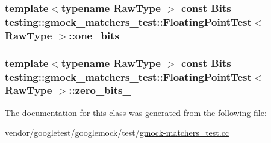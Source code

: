 \subsubsection[{\texorpdfstring{one\+\_\+bits\+\_\+}{one_bits_}}]{\setlength{\rightskip}{0pt plus 5cm}template$<$typename Raw\+Type $>$ const {\bf Bits} {\bf testing\+::gmock\+\_\+matchers\+\_\+test\+::\+Floating\+Point\+Test}$<$ Raw\+Type $>$\+::one\+\_\+bits\+\_\+\hspace{0.3cm}{\ttfamily [protected]}}\hypertarget{classtesting_1_1gmock__matchers__test_1_1FloatingPointTest_ae26de8492d307d2b4c30f6b952d9a412}{}\label{classtesting_1_1gmock__matchers__test_1_1FloatingPointTest_ae26de8492d307d2b4c30f6b952d9a412}
\subsubsection[{\texorpdfstring{zero\+\_\+bits\+\_\+}{zero_bits_}}]{\setlength{\rightskip}{0pt plus 5cm}template$<$typename Raw\+Type $>$ const {\bf Bits} {\bf testing\+::gmock\+\_\+matchers\+\_\+test\+::\+Floating\+Point\+Test}$<$ Raw\+Type $>$\+::zero\+\_\+bits\+\_\+\hspace{0.3cm}{\ttfamily [protected]}}\hypertarget{classtesting_1_1gmock__matchers__test_1_1FloatingPointTest_afb9b6beb1f152693155cf7db4e1fc4d2}{}\label{classtesting_1_1gmock__matchers__test_1_1FloatingPointTest_afb9b6beb1f152693155cf7db4e1fc4d2}


The documentation for this class was generated from the following file\+:\begin{DoxyCompactItemize}
\item 
vendor/googletest/googlemock/test/\hyperlink{gmock-matchers__test_8cc}{gmock-\/matchers\+\_\+test.\+cc}\end{DoxyCompactItemize}
